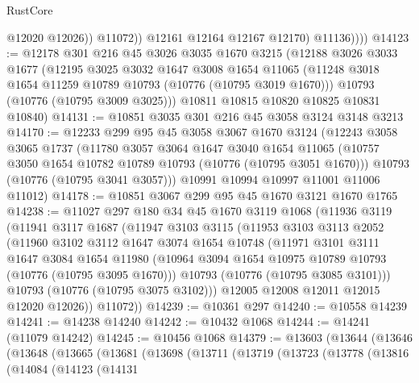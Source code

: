 \begin{lexlean}{RustCore}
\begin{coremodule}
                      @12020
                      @12026))
                  @11072))
              @12161
              @12164
              @12167
              @12170)
            @11136))))
@14123 := @12178
    @301
    @216
    @45
    @3026
    @3035
    @1670
    @3215
    (@12188
      @3026
      @3033
      @1677
      (@12195
        @3025
        @3032
        @1647
        @3008
        @1654
        @11065
        (@11248 @3018 @1654 @11259 @10789 @10793 (@10776 (@10795 @3019 @1670)))
        @10793
        (@10776 (@10795 @3009 @3025)))
      @10811
      @10815
      @10820
      @10825
      @10831
      @10840)
@14131 := @10851 @3035 @301 @216 @45 @3058 @3124 @3148 @3213
@14170 := @12233
    @299
    @95
    @45
    @3058
    @3067
    @1670
    @3124
    (@12243
      @3058
      @3065
      @1737
      (@11780
        @3057
        @3064
        @1647
        @3040
        @1654
        @11065
        (@10757 @3050 @1654 @10782 @10789 @10793 (@10776 (@10795 @3051 @1670)))
        @10793
        (@10776 (@10795 @3041 @3057)))
      @10991
      @10994
      @10997
      @11001
      @11006
      @11012)
@14178 := @10851 @3067 @299 @95 @45 @1670 @3121 @1670 @1765
@14238 := @11027
    @297
    @180
    @34
    @45
    @1670
    @3119
    @1068
    (@11936
      @3119
      (@11941
        @3117
        @1687
        (@11947
          @3103
          @3115
          (@11953
            @3103
            @3113
            @2052
            (@11960
              @3102
              @3112
              @1647
              @3074
              @1654
              @10748
              (@11971
                @3101
                @3111
                @1647
                @3084
                @1654
                @11980
                (@10964 @3094 @1654 @10975 @10789 @10793 (@10776 (@10795 @3095 @1670)))
                @10793
                (@10776 (@10795 @3085 @3101)))
              @10793
              (@10776 (@10795 @3075 @3102)))
            @12005
            @12008
            @12011
            @12015
            @12020
            @12026))
        @11072))
@14239 := @10361 @297
@14240 := @10558 @14239
@14241 := @14238 @14240
@14242 := @10432 @1068
@14244 := @14241 (@11079 @14242)
@14245 := @10456 @1068
@14379 := @13603
    (@13644
      (@13646
        (@13648
          (@13665
            (@13681
              (@13698
                (@13711
                  (@13719
                    (@13723
                      (@13778
                        (@13816
                          (@14084
                            (@14123
                              (@14131

\end{coremodule}
\end{lexlean}
